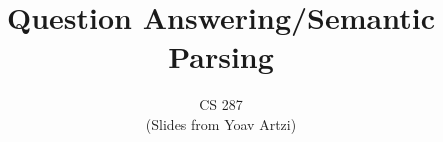 \documentclass{beamer}
\title{Question Answering/Semantic Parsing}
\date{}
\author{CS 287 \\ (Slides from Yoav Artzi)}
\begin{document}
\begin{frame}
  \titlepage
\end{frame}










      


\end{document}
